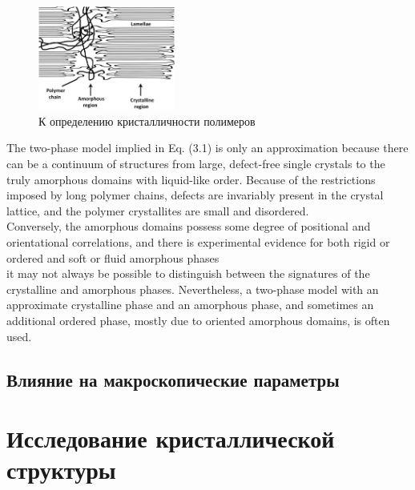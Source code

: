 	\begin{figure} 
\vspace{-20pt}
  \begin{center}
    \includegraphics[width=0.4\textwidth]{fig/crystal-2.jpg}
    \caption{К определению кристалличности полимеров}
    \label{fig:crystal-2}
  \end{center}
  \vspace{-20pt}
  \vspace{1pt}
\end{figure}	

The two-phase model implied in Eq. (3.1) is only an approximation because
there can be a continuum of structures from large, defect-free single crystals to
the truly amorphous domains with liquid-like order. Because of the restrictions
imposed by long polymer chains, defects are invariably present in the crystal lattice,
and the polymer crystallites are small and disordered.\\
Conversely, the amorphous
domains possess some degree of positional and orientational correlations, and there
is experimental evidence for both rigid or ordered and soft or fluid amorphous phases\\
it may not always be possible to distinguish between the signatures
of the crystalline and amorphous phases. Nevertheless, a two-phase model with
an approximate crystalline phase and an amorphous phase, and sometimes an additional
ordered phase, mostly due to oriented amorphous domains, is often used.\\



\subsection{Влияние на макроскопические параметры}

\section{Исследование кристаллической структуры}

